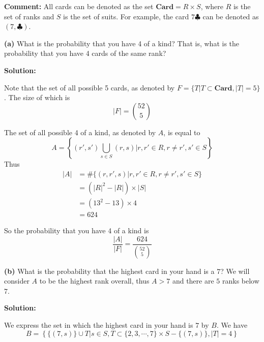 \documentclass[11pt]{article}
\renewcommand\part[1]{\vspace{.10in}\textbf{(#1)}}
\newcommand{\solution}{\vspace{.10in}\textbf{Solution: }}
\begin{document}
\newcommand{\card}{\mathbf{Card}}

\textbf{Comment:} All cards can be denoted as the set $\card = R\times S$, where $R$ is the set of ranks and $S$ is the set of suits. For example, the card $7\clubsuit$ can be denoted as $(7, \clubsuit)$.

\part{a} What is the probability that you have 4 of a kind? That is, what is the probability that you have 4 cards of the same rank?

\solution

Note that the set of all possible 5 cards, as denoted by $F=\{T|T\subset \card, |T| = 5\}$. The size of which is
\begin{equation*}
  |F| = \binom{52}{5}
\end{equation*}

The set of all possible 4 of a kind, as denoted by $A$, is equal to
\begin{equation*}
  A = \left\{(r',s')\bigcup_{s\in S}(r,s)|r, r'\in R, r\neq r', s'\in S\right\}
\end{equation*}
Thus
\begin{align*}
  |A| &= \#\{(r,r',s)|r, r'\in R, r\neq r', s'\in S \}\\
      &= (|R|^2 - |R|)\times |S| \\ 
      &= (13^2-13) \times 4 \\
      &= 624
\end{align*}

So the probability that you have 4 of a kind is
\begin{equation*}
  \frac{|A|}{|F|} = \frac{624}{\binom{52}{5}}
\end{equation*}

\part{b} What is the probability that the highest card in your hand is a $7$? We will consider $A$ to be the highest rank overall, thus $A > 7$ and there are $5$ ranks below $7$.

\solution

We express the set in which the highest card in your hand is $7$ by $B$. We have 
\begin{equation*}
  B = \left\{\{(7,s)\}\cup T|s\in S, T\subset \{2,3,\cdots, 7\} \times S - \{(7,s)\}, |T| = 4\right\}
\end{equation*}
\end{document}
